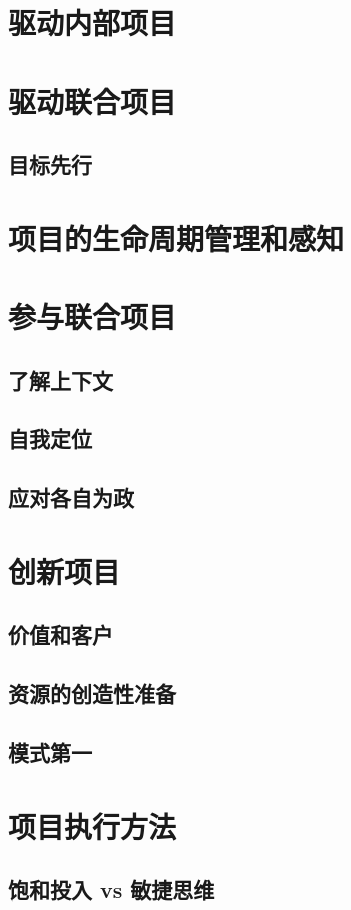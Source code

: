 
\section{驱动内部项目}

\section{驱动联合项目}
\subsection{目标先行}
\section{项目的生命周期管理和感知}

\section{参与联合项目}
\subsection{了解上下文}
\subsection{自我定位}
\subsection{应对各自为政}

\section{创新项目}
\subsection{价值和客户}
\subsection{资源的创造性准备}
\subsection{模式第一}

\section{项目执行方法}
\subsection{饱和投入 vs 敏捷思维}
